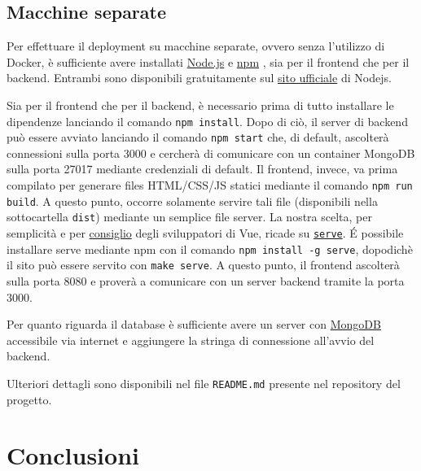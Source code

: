\documentclass[a4paper,12pt]{report}
\newcommand{\node}{\href{https://nodejs.org/it/}{Node.js} }
\newcommand{\npm}{\href{https://www.npmjs.com/}{npm} }
\newcommand{\mongodb}{\href{https://www.mongodb.com/it-it}{MongoDB} }
\begin{document}
\section{Macchine separate}
Per effettuare il deployment su macchine separate, ovvero senza l'utilizzo di Docker, è sufficiente avere installati \node e \npm, sia per il frontend che per il backend. Entrambi sono disponibili gratuitamente sul \href{https://nodejs.org/it/download/}{sito ufficiale} di Nodejs.

Sia per il frontend che per il backend, è necessario prima di tutto installare le dipendenze lanciando il comando \texttt{npm install}. Dopo di ciò, il server di backend può essere avviato lanciando il comando \texttt{npm start} che, di default, ascolterà connessioni sulla porta 3000 e cercherà di comunicare con un container MongoDB sulla porta 27017 mediante credenziali di default. Il frontend, invece, va prima compilato per generare files HTML/CSS/JS statici mediante il comando \texttt{npm run build}. A questo punto, occorre solamente servire tali file (disponibili nella sottocartella \texttt{dist}) mediante un semplice file server. La nostra scelta, per semplicità e per \href{https://cli.vuejs.org/guide/deployment.html}{consiglio} degli sviluppatori di Vue, ricade su \href{https://www.npmjs.com/package/serve}{\texttt{serve}}. \'E possibile installare serve mediante npm con il comando \texttt{npm install -g serve}, dopodichè il sito può essere servito con \texttt{make serve}. A questo punto, il frontend ascolterà sulla porta 8080 e proverà a comunicare con un server backend tramite la porta 3000.

Per quanto riguarda il database è sufficiente avere un server con \mongodb accessibile via internet e aggiungere la stringa di connessione all'avvio del backend.

Ulteriori dettagli sono disponibili nel file \texttt{README.md} presente nel repository del progetto.

\clearpage
\chapter{Conclusioni}
\end{document}

